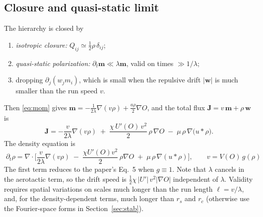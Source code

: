 \documentclass[11pt,a4paper]{article}
\newcommand{\vect}[1]{\bm{#1}}
\begin{document}
\subsection{Closure and quasi-static limit}
The hierarchy is closed by
\begin{enumerate}[label=(\roman*)]
\item \emph{isotropic closure:} $Q_{ij}\simeq\tfrac12\rho\,\delta_{ij}$;
\item \emph{quasi-static polarization:} $\partial_t\vect{m}\ll\lambda\vect{m}$, valid on times $\gg1/\lambda$;
\item dropping $\partial_j(w_jm_i)$, which is small when the repulsive drift $|\vect{w}|$ is much smaller than the run speed $v$.
\end{enumerate}
Then \eqref{eq:mom} gives $\vect{m}=-\frac{1}{2\lambda}\nabla(v\rho)+\frac{a\rho}{2}\nabla O$, and the total flux $\vect{J}=v\,\vect{m}+\rho\,\vect{w}$ is
\begin{equation}
\vect{J}=-\frac{v}{2\lambda}\nabla(v\rho)\;+\;\frac{\chi\,U'(O)\,v^2}{2}\,\rho\,\nabla O\;-\;\mu\,\rho\,\nabla\big(u*\rho\big).
\label{eq:flux}
\end{equation}
The density equation is
\begin{equation}
\boxed{\;\partial_t\rho=\nabla\!\cdot\!\Big[\frac{v}{2\lambda}\nabla(v\rho)\;-\;\frac{\chi U'(O)v^2}{2}\,\rho\nabla O\;+\;\mu\,\rho\,\nabla(u*\rho)\Big],\qquad v=V(O)\,g(\rho)\;}
\label{eq:FP}
\end{equation}
The first term reduces to the paper's Eq.~5 when $g\equiv1$. Note that $\lambda$ cancels in the aerotactic term, so the drift speed is $\tfrac12\chi\,|U'|\,v^2|\nabla O|$ independent of $\lambda$. Validity requires spatial variations on scales much longer than the run length $\ell=v/\lambda$, and, for the density-dependent terms, much longer than $r_s$ and $r_c$ (otherwise use the Fourier-space forms in Section~\ref{sec:stab}).
\end{document}
